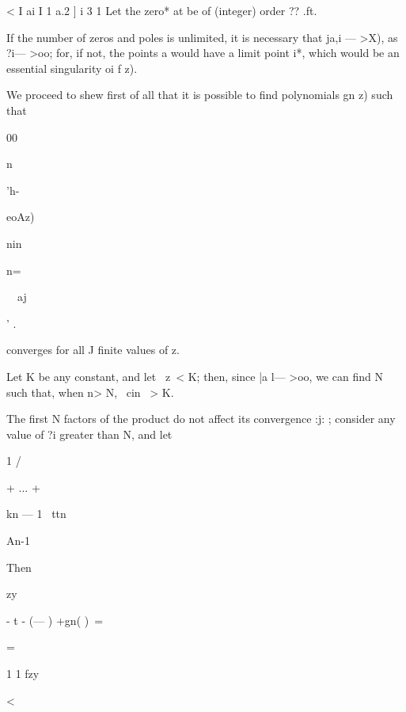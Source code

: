 < I ai I 1 a.2 ] i 3 1 Let the zero* at be of (integer) order ?? .ft.

If the number of zeros and poles is unlimited, it is necessary that
ja,i — >X), as ?i— >oo; for, if not, the points a would have a limit
point i*, which would be an essential singularity oi f z).

We proceed to shew first of all that it is possible to find
polynomials gn z) such that



00

n


'h-~\


eoAz)


nin


n=\


\ \ aj




' .



converges for all J finite values of z.

Let K be any constant, and let \ z\ < K; then, since |a l— >oo, we can
find N such that, when n> N, \ cin \ > K.

The first N factors of the product do not affect its convergence :j: ;
consider any value of ?i greater than N, and let






1 /



+ ... +



kn — 1 \ ttn



An-1



Then



zy



- t - (— ) +gn( )\ =



=


1 1 fzy


<





